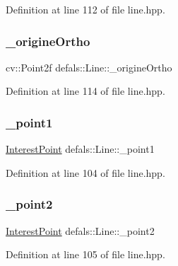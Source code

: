 Definition at line 112 of file line.\+hpp.

\mbox{\label{classdefals_1_1_line_aa132df249a860ea17578f8342ff0eaaa}} 
\subsubsection{\texorpdfstring{\+\_\+origine\+Ortho}{\_origineOrtho}}
{\footnotesize\ttfamily cv\+::\+Point2f defals\+::\+Line\+::\+\_\+origine\+Ortho\hspace{0.3cm}{\ttfamily [private]}}



Definition at line 114 of file line.\+hpp.

\mbox{\label{classdefals_1_1_line_a80a5cb3ddcc4a8e0886f11c28b8aec82}} 
\subsubsection{\texorpdfstring{\+\_\+point1}{\_point1}}
{\footnotesize\ttfamily \hyperlink{classdefals_1_1_interest_point}{Interest\+Point} defals\+::\+Line\+::\+\_\+point1\hspace{0.3cm}{\ttfamily [private]}}



Definition at line 104 of file line.\+hpp.

\mbox{\label{classdefals_1_1_line_a11de125d1a030be2ad42ebe9742ea6ad}} 
\subsubsection{\texorpdfstring{\+\_\+point2}{\_point2}}
{\footnotesize\ttfamily \hyperlink{classdefals_1_1_interest_point}{Interest\+Point} defals\+::\+Line\+::\+\_\+point2\hspace{0.3cm}{\ttfamily [private]}}



Definition at line 105 of file line.\+hpp.

